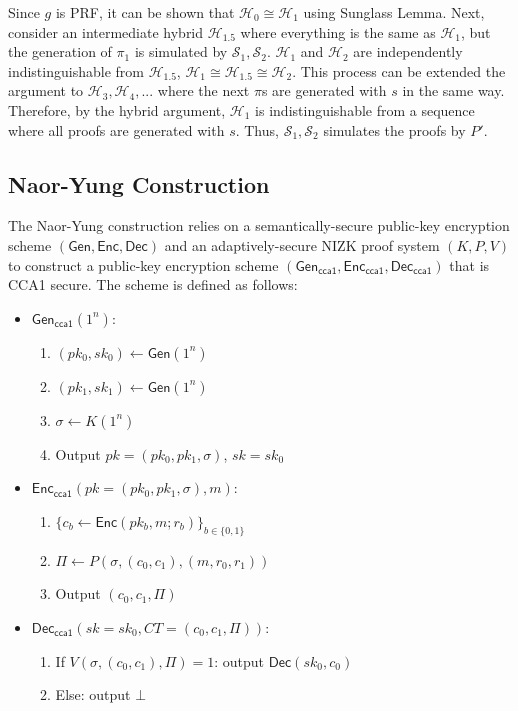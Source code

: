 \documentclass[12pt]{tufte-book}
\newcommand{\bit}{\{0,1\}}
\begin{document}
Since $g$ is PRF, it can be shown that $\mathcal{H}_0 \cong \mathcal{H}_1$ using Sunglass Lemma. Next, consider an intermediate hybrid $\mathcal{H}_{1.5}$ where everything is the same as $\mathcal{H}_1$, but the generation of $\pi_1$ is simulated by $\mathcal{S}_1, \mathcal{S}_2$. $\mathcal{H}_1$ and $\mathcal{H}_2$ are independently indistinguishable from $\mathcal{H}_{1.5}$, $\mathcal{H}_1 \cong \mathcal{H}_{1.5} \cong \mathcal{H}_2$. This process can be extended the argument to $\mathcal{H}_3, \mathcal{H}_4,...$ where the next $\pi$s are generated with $s$ in the same way. Therefore, by the hybrid argument, $\mathcal{H}_1$ is indistinguishable from a sequence where all proofs are generated with $s$. Thus, $\mathcal{S}_1, \mathcal{S}_2$ simulates the proofs by $P'$.



\subsection{Naor-Yung Construction}

The Naor-Yung construction relies on a semantically-secure public-key encryption scheme $(\mathsf{Gen}, \mathsf{Enc}, \mathsf{Dec})$ and an adaptively-secure NIZK proof system $(K, P, V)$ to construct a public-key encryption scheme $(\mathsf{Gen_{cca1}}, \mathsf{Enc_{cca1}}, \mathsf{Dec_{cca1}})$ that is CCA1 secure. The scheme is defined as follows:

\begin{itemize}
    \item $\mathsf{Gen_{cca1}}(1^n): $
    \begin{enumerate}
        \item $(pk_0, sk_0) \gets \mathsf{Gen}(1^n)$
        \item $(pk_1, sk_1) \gets \mathsf{Gen}(1^n)$
        \item $\sigma \gets K(1^n)$
        \item Output $pk = (pk_0, pk_1, \sigma)$, $sk = sk_0$
    \end{enumerate}
    \item $\mathsf{Enc_{cca1}}(pk = (pk_0, pk_1, \sigma), m): $
    \begin{enumerate}
        \item $\{c_b \gets \mathsf{Enc}(pk_b, m; r_b)\}_{b\in\bit}$
        \item $\Pi \gets P(\sigma, (c_0, c_1), (m, r_0, r_1))$
        \item Output $(c_0, c_1, \Pi)$
    \end{enumerate}
    \item  $\mathsf{Dec_{cca1}}(sk = sk_0, CT = (c_0, c_1, \Pi)): $
    \begin{enumerate}
        \item If $V(\sigma, (c_0, c_1), \Pi) = 1$: output $\mathsf{Dec}(sk_0, c_0)$
        \item Else: output $\bot$
    \end{enumerate}
\end{itemize}
\end{document}
